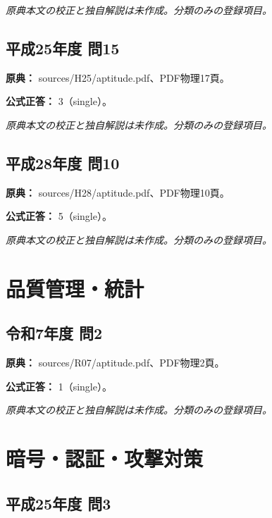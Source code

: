 \par\textit{原典本文の校正と独自解説は未作成。分類のみの登録項目。}

\subsection{平成25年度 問15}
\label{q:h25-reg-apt-15}

\noindent\textbf{原典：} sources/H25/aptitude.pdf、PDF物理17頁。

\textbf{公式正答：} 3（single）。

\par\textit{原典本文の校正と独自解説は未作成。分類のみの登録項目。}

\subsection{平成28年度 問10}
\label{q:h28-reg-apt-10}

\noindent\textbf{原典：} sources/H28/aptitude.pdf、PDF物理10頁。

\textbf{公式正答：} 5（single）。

\par\textit{原典本文の校正と独自解説は未作成。分類のみの登録項目。}

\section{品質管理・統計}

\subsection{令和7年度 問2}
\label{q:r07-reg-apt-02}

\noindent\textbf{原典：} sources/R07/aptitude.pdf、PDF物理2頁。

\textbf{公式正答：} 1（single）。

\par\textit{原典本文の校正と独自解説は未作成。分類のみの登録項目。}

\section{暗号・認証・攻撃対策}

\subsection{平成25年度 問3}
\label{q:h25-reg-apt-03}

